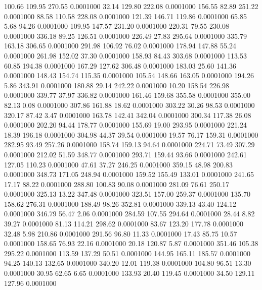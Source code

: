  100.66  109.95  270.55   0.0001000
  32.14  129.80  222.08   0.0001000
 156.55   82.89  251.22   0.0001000
  88.58  110.58  228.08   0.0001000
 121.39  146.71  119.86   0.0001000
  65.85    5.68   94.26   0.0001000
 109.95  147.57  231.20   0.0001000
 220.31   79.55  230.08   0.0001000
 336.18   89.25  126.51   0.0001000
 226.49   27.83  295.64   0.0001000
 335.79  163.18  306.65   0.0001000
 291.98  106.92   76.02   0.0001000
 178.94  147.88   55.24   0.0001000
 261.98  152.02   37.30   0.0001000
 158.93   84.43  303.68   0.0001000
 113.53   60.85  194.38   0.0001000
 167.29  127.62  306.48   0.0001000
 183.03   25.60  141.36   0.0001000
 148.43  154.74  115.35   0.0001000
 105.54  148.66  163.05   0.0001000
 194.26    5.86  343.91   0.0001000
 180.88   29.14  242.22   0.0001000
  10.20  158.54  226.98   0.0001000
 339.77   37.97  336.82   0.0001000
 161.46  159.68  355.58   0.0001000
 355.00   82.13    0.08   0.0001000
 307.86  161.88   18.62   0.0001000
 303.22   30.26   98.53   0.0001000
 320.17   87.42    3.47   0.0001000
 163.78  142.41  342.04   0.0001000
 300.34  117.38   26.08   0.0001000
 202.20   94.44  178.77   0.0001000
 155.69   19.00  293.95   0.0001000
 221.24   18.39  196.18   0.0001000
 304.98   44.37   39.54   0.0001000
  19.57   76.17  159.31   0.0001000
 282.95   93.49  257.26   0.0001000
 158.74  159.13   94.64   0.0001000
 224.71   73.49  307.29   0.0001000
 212.02   51.59  348.77   0.0001000
 293.71  159.44   93.66   0.0001000
 242.61  127.05  110.23   0.0001000
  47.61   37.27  246.25   0.0001000
 359.15   48.98  200.83   0.0001000
 348.73  171.05  248.94   0.0001000
 159.52  155.49  133.01   0.0001000
 241.65   17.17   88.22   0.0001000
 288.80  100.83   90.08   0.0001000
 281.09   76.61  250.17   0.0001000
 325.13   13.22  347.48   0.0001000
 323.51  157.00  259.37   0.0001000
 135.70  158.62  276.31   0.0001000
 188.49   98.26  352.81   0.0001000
 339.13   43.40  124.12   0.0001000
 346.79   56.47    2.06   0.0001000
 284.59  107.55  294.64   0.0001000
  28.44    8.82   39.27   0.0001000
  81.13  114.21  298.62   0.0001000
  83.67  123.20  177.78   0.0001000
  32.48    5.98  210.86   0.0001000
 291.56   96.80   11.33   0.0001000
  17.43   85.75   10.57   0.0001000
 158.65   76.93   22.16   0.0001000
  20.18  120.87    5.87   0.0001000
 351.46  105.38  295.22   0.0001000
 113.59  137.29   50.51   0.0001000
 144.95  165.11  185.57   0.0001000
  94.25  140.13  132.65   0.0001000
 340.20   12.01  119.38   0.0001000
 104.80   96.51   13.30   0.0001000
  30.95   62.65    6.65   0.0001000
 133.93   20.40  119.45   0.0001000
  34.50  129.11  127.96   0.0001000
